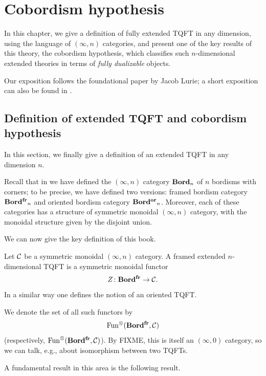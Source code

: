 \chapter{Cobordism hypothesis}\label{c:cob-hyp}

In this chapter, we give a definition of fully extended TQFT in
any dimension, using the language of $(\infty,n)$ categories, and
present one of the key results of this theory, the cobordism hypothesis,
which classifies such $n$-dimensional extended theories in terms of
\emph{fully dualizable} objects.

Our exposition follows the foundational paper
 by Jacob Lurie; a short exposition can also be
found in .

\section{Definition of extended TQFT and cobordism hypothesis}\label{s:cobordism-hypothesis}
In this section, we finally give a definition of an extended TQFT in any
dimension $n$.

Recall that in  we have defined the $(\infty,n)$
category $\mathbf{Bord}_n$ of $n$ bordisms with corners; to be precise, we have defined
two versions: framed bordism category $\mathbf{Bord^{fr}}_n$ and oriented bordism category
$\mathbf{Bord^{or}}_n$. Moreover, each of these categories has a structure of symmetric
monoidal $(\infty,n)$ category, with the monoidal structure given by the
disjoint union.

We can now give the key definition of this book.

\begin{definition}\label{d:xtqft-infty}
  Let $\mathcal{C}$ be a symmetric monoidal $(\infty, n)$ category. A framed extended
  $n$-dimensional TQFT is a symmetric monoidal functor
  $$
    Z\colon \mathbf{Bord^{fr}} \to \mathcal{C}.
  $$
  In a similar way one defines the notion of an oriented TQFT.
\end{definition}

We denote the set of all such functors by
$$
  \operatorname{Fun}^{\otimes}(\mathbf{Bord^{fr}}, \mathcal{C})
$$
(respectively,   $\operatorname{Fun}^{\otimes}(\mathbf{Bord^{fr}}, \mathcal{C})$). By FIXME, this is itself an
$(\infty, 0)$ category, so we can talk, e.g.,  about isomorphism between two
TQFTs.


A fundamental result in this area is the following result.


